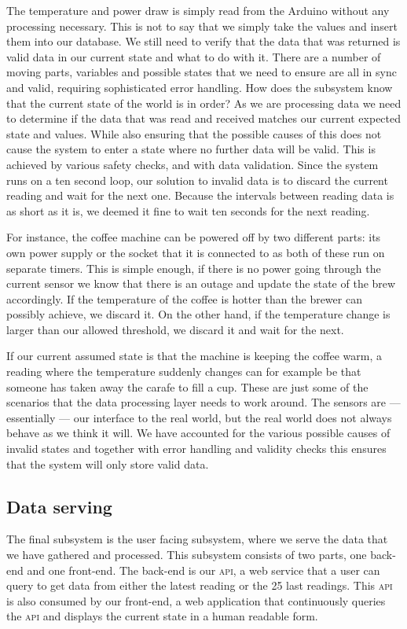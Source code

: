 \documentclass[12pt,a4paper,oneside,article]{memoir}
\numberwithin{equation}{chapter}
\begin{document}
The temperature and power draw is simply read from the Arduino without any
processing necessary. This is not to say that we simply take the values and
insert them into our database. We still need to verify that the data that was
returned is valid data in our current state and what to do with it. There are a
number of moving parts, variables and possible states that we need to ensure are
all in sync and valid, requiring sophisticated error handling. How does the
subsystem know that the current state of the world is in order? As we are
processing data we need to determine if the data that was read and received
matches our current expected state and values. While also ensuring that the
possible causes of this does not cause the system to enter a state where no
further data will be valid. This is achieved by various safety checks, and with
data validation. Since the system runs on a ten second loop, our solution to
invalid data is to discard the current reading and wait for the next one.
Because the intervals between reading data is as short as it is, we deemed it
fine to wait ten seconds for the next reading.

For instance, the coffee machine can be powered off by two different parts: its
own power supply or the socket that it is connected to as both of these run on
separate timers. This is simple enough, if there is no power going through the
current sensor we know that there is an outage and update the state of the brew
accordingly. If the temperature of the coffee is hotter than the brewer can
possibly achieve, we discard it. On the other hand, if the temperature change is
larger than our allowed threshold, we discard it and wait for the next.

If our current assumed state is that the machine is keeping the coffee warm, a
reading where the temperature suddenly changes can for example be that someone
has taken away the carafe to fill a cup. These are just some of the scenarios
that the data processing layer needs to work around. The sensors are ---
essentially --- our interface to the real world, but the real world does not
always behave as we think it will. We have accounted for the various possible
causes of invalid states and together with error handling and validity checks
this ensures that the system will only store valid data.

\subsection{Data serving}\label{sec:data-serving}
The final subsystem is the user facing subsystem, where we serve the data that
we have gathered and processed. This subsystem consists of two parts, one
back-end and one front-end. The back-end is our \textsc{api}, a web service that
a user can query to get data from either the latest reading or the 25 last
readings. This \textsc{api} is also consumed by our front-end, a web application
that continuously queries the \textsc{api} and displays the current state in a
human readable form.
\end{document}
